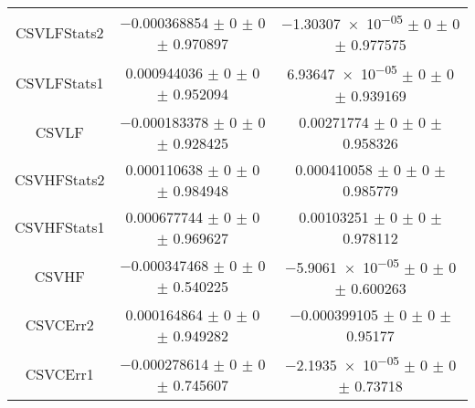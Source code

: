 \begin{table}
\begin{tabular}{ccc}
CSVLFStats2 	& \num{-0.000368854} $\pm$ \num{0} $\pm$ \num{0} $\pm$ \num{0.970897} 	& \num{-1.30307e-05} $\pm$ \num{0} $\pm$ \num{0} $\pm$ \num{0.977575}\\
CSVLFStats1 	& \num{0.000944036} $\pm$ \num{0} $\pm$ \num{0} $\pm$ \num{0.952094} 	& \num{6.93647e-05} $\pm$ \num{0} $\pm$ \num{0} $\pm$ \num{0.939169}\\
CSVLF 	& \num{-0.000183378} $\pm$ \num{0} $\pm$ \num{0} $\pm$ \num{0.928425} 	& \num{0.00271774} $\pm$ \num{0} $\pm$ \num{0} $\pm$ \num{0.958326}\\
CSVHFStats2 	& \num{0.000110638} $\pm$ \num{0} $\pm$ \num{0} $\pm$ \num{0.984948} 	& \num{0.000410058} $\pm$ \num{0} $\pm$ \num{0} $\pm$ \num{0.985779}\\
CSVHFStats1 	& \num{0.000677744} $\pm$ \num{0} $\pm$ \num{0} $\pm$ \num{0.969627} 	& \num{0.00103251} $\pm$ \num{0} $\pm$ \num{0} $\pm$ \num{0.978112}\\
CSVHF 	& \num{-0.000347468} $\pm$ \num{0} $\pm$ \num{0} $\pm$ \num{0.540225} 	& \num{-5.9061e-05} $\pm$ \num{0} $\pm$ \num{0} $\pm$ \num{0.600263}\\
CSVCErr2 	& \num{0.000164864} $\pm$ \num{0} $\pm$ \num{0} $\pm$ \num{0.949282} 	& \num{-0.000399105} $\pm$ \num{0} $\pm$ \num{0} $\pm$ \num{0.95177}\\
CSVCErr1 	& \num{-0.000278614} $\pm$ \num{0} $\pm$ \num{0} $\pm$ \num{0.745607} 	& \num{-2.1935e-05} $\pm$ \num{0} $\pm$ \num{0} $\pm$ \num{0.73718}\\
\bottomrule
\end{tabular}
\end{table}